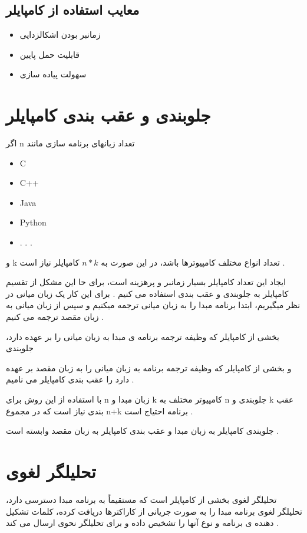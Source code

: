 \documentclass{book}
\begin{document}
\subsection{معایب استفاده از کامپایلر}

\begin{itemize}
	\item زمانبر بودن اشکالزدایی
	\item قابلیت حمل پایین
	\item سهولت پیاده سازی
\end{itemize}



\section{جلوبندی و عقب بندی کامپایلر}
اگر n تعداد زبانهای برنامه سازی مانند
\begin{itemize}
	\item C
	\item C++
	\item Java
	\item Python
	\item . . .
\end{itemize}

و k تعداد انواع مختلف کامپیوترها باشد، در این صورت به $n*k$ کامپایلر نیاز است .

ایجاد این تعداد کامپایلر بسیار زمانبر و پرهزینه است، برای حا این مشکل از تقسیم کامپایلر به جلوبندی و عقب بندی استفاده می کنیم .
برای این کار یک زبان میانی در نظر میگیریم، ابتدا برنامه مبدا را به زبان میانی ترجمه میکنیم و سپس از زبان میانی به زبان مقصد ترجمه می کنیم .

بخشی از کامپایلر که وظیفه ترجمه برنامه ی مبدا به زبان میانی را بر عهده دارد، جلوبندی

 و بخشی از کامپایلر که وظیفه ترجمه برنامه به زبان میانی را به زبان مقصد بر عهده دارد را عقب بندی کامپایلر می نامیم .
 
 با استفاده از این روش برای n زبان مبدا و k کامپیوتر مختلف به n جلوبندی و k عقب بندی نیاز است که در مجموع n+k برنامه احتیاج است .
 
 جلویندی کامپایلر به زبان مبدا و عقب بندی کامپایلر به زبان مقصد وابسته است .
 
 
\section{تحلیلگر لغوی}
تحلیلگر لغوی بخشی از کامپایلر است که مستقیماً به برنامه مبدا دسترسی دارد، تحلیلگر لغوی برنامه مبدا را به صورت جریانی از کاراکترها دریافت کرده، کلمات تشکیل دهنده ی برنامه و نوع آنها را تشخیص داده و برای تحلیلگر نحوی ارسال می کند .
\end{document}

